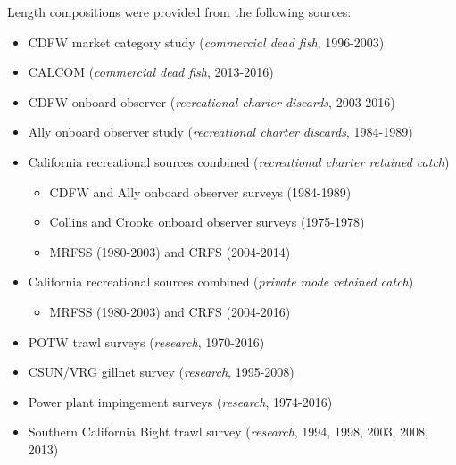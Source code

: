 \documentclass[ignorenonframetext,compress]{beamer}
\begin{document}
\begin{frame}{Length compositions were provided from the following
sources:}

\begin{itemize}[noitemsep,nolistsep,topsep=0pt]
  \item CDFW market category study (\emph{commercial dead fish}, 1996-2003)    
  \item CALCOM (\emph{commercial dead fish}, 2013-2016)    
  \item CDFW onboard observer (\emph{recreational charter discards}, 2003-2016)    
  \item Ally onboard observer study (\emph{recreational charter discards}, 1984-1989)  
  \item California recreational sources combined (\emph{recreational charter retained catch})     
    \begin{itemize}[noitemsep,nolistsep]
      \item CDFW and Ally onboard observer surveys (1984-1989)     
      \item Collins and Crooke onboard observer surveys (1975-1978)     
      \item MRFSS (1980-2003) and CRFS (2004-2014)
    \end{itemize}
 \item California recreational sources combined (\emph{private mode retained catch})      
    \begin{itemize}[noitemsep,nolistsep]   
      \item MRFSS (1980-2003) and CRFS (2004-2016)  
    \end{itemize}
 \item POTW trawl surveys (\emph{research}, 1970-2016)      
 \item CSUN/VRG gillnet survey (\emph{research}, 1995-2008)        
 \item Power plant impingement surveys (\emph{research}, 1974-2016)  
 \item Southern California Bight trawl survey (\emph{research}, 1994, 1998, 2003, 2008, 2013) 
\end{itemize}

\end{frame}
\end{document}
